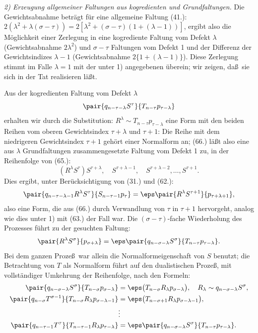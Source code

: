 \emph{2) Erzeugung allgemeiner Faltungen aus kogredienten und Grundfaltungen.} Die Gewichtsabnahme betr\"agt f\"ur eine allgemeine Faltung (41.): $2(\lambda^2+\lambda(\sigma-\tau))=2[\lambda^2+(\sigma-\tau)(1+(\lambda-1))]$, ergibt also die M\"oglichkeit einer Zerlegung in eine kogrediente Faltung vom Defekt $\lambda$ (Gewichtsabnahme $2\lambda^2$) und $\sigma-\tau$ Faltungen vom Defekt 1 und der Differenz der Gewichtsindizes $\lambda-1$ (Gewichtsabnahme $2\{1+(\lambda-1)\}$). Diese Zerlegung stimmt im Falle $\lambda=1$ mit der unter 1) angegebenen \"uberein; wir zeigen, da\ss\ sie sich in der Tat realisieren l\"a\ss t.

Aus der kogredienten Faltung vom Defekt $\lambda$
\[
 \pair{q_{n-\tau-\lambda}S^\tau}{T_{n-\tau}p_{\tau-\lambda}}
\]
erhalten wir durch die Substitution: $R^\lambda\sim T_{n-\tau}p_{\tau-\lambda}$ eine Form mit den beiden Reihen vom oberen Gewichtsindex $\tau+\lambda$ und $\tau+1$:
Die Reihe mit dem niedrigeren Gewichtsindex $\tau+1$ geh\"ort einer Normalform an; (66.) l\"a\ss t also eine aus $\lambda$ Grundfaltungen zusammengesetzte Faltung vom Defekt 1 zu, in der Reihenfolge von (65.):
\[
 (R^\lambda S^\tau)S^{\tau+\lambda},\quad S^{\tau+\lambda-1},\quad S^{\tau+\lambda-2},\ldots,S^{\tau+1}.
\]
Dies ergibt, unter Ber\"ucksichtigung von (31.) und (62.):
\[
 \pair{q_{n-\tau-\lambda-1}R^\lambda S^\tau}{S_{n-\tau-1}p_\tau}=\eps\pair{R^\lambda S^{\tau+1}}{p_{\tau+\lambda+1}},
\]
also eine Form, die aus (66.) durch Verwandlung von $\tau$ in $\tau+1$ hervorgeht, analog wie dies unter 1) mit (63.) der Fall war. Die $(\sigma-\tau)$-fache Wiederholung des Prozesses f\"uhrt zu der gesuchten Faltung:
\[
 \pair{R^\lambda S^\sigma}{p_{\sigma+\lambda}}=\eps\pair{q_{n-\sigma-\lambda}S^\sigma}{T_{n-\tau}p_{\tau-\lambda}}.
\]
Bei dem ganzen Proze\ss\ war allein die Normalformeigenschaft von $S$ benutzt; die Betrachtung von $T$ als Normalform f\"uhrt auf den dualistischen Proze\ss, mit vollst\"andiger Umkehrung der Reihenfolge, nach den Formeln:
\begin{align*}
\pair{q_{n-\sigma-\lambda}S^\sigma}{T_{n-\sigma}p_{\sigma-\lambda}}&=\eps\bigl(T_{n-\sigma}R_\lambda p_{\sigma-\lambda}\bigr),\quad R_\lambda\sim q_{n-\sigma-\lambda}S^\sigma,\\
\pair{q_{n-\sigma}T^{\sigma-1}}{T_{n-\sigma}R_\lambda p_{\sigma-\lambda-1}}&=\eps\bigl(T_{n-\sigma+1}R_\lambda p_{\sigma-\lambda-1}\bigr),\\
&\vdots\\
\pair{q_{n-\tau-1}T^\tau}{T_{n-\tau-1}R_\lambda p_{\tau-\lambda}}&=\eps\pair{q_{n-\sigma-\lambda}S^\sigma}{T_{n-\tau}p_{\tau-\lambda}}.
\end{align*}
